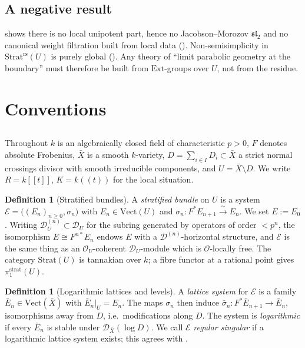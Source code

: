 \documentclass[11pt,reqno]{amsart}
\newcommand{\cO}{\mathcal{O}}
\newcommand{\cD}{\mathcal{D}}
\newcommand{\cE}{\mathcal{E}}
\newcommand{\Strat}{\mathrm{Strat}}
\newcommand{\rs}{\mathrm{rs}}
\newcommand{\strat}{\mathrm{strat}}
\newcommand{\Vect}{\mathrm{Vect}}
\newcommand{\Ext}{\mathrm{Ext}}
\newcommand{\isoto}{\xrightarrow{\ \sim\ }}
\theoremstyle{plain}
\theoremstyle{definition}
\newtheorem{definition}[theorem]{Definition}
\theoremstyle{remark}
\numberwithin{equation}{section}
\begin{document}
\subsection{A negative result}
 shows there is no local unipotent part, hence no
Jacobson--Morozov $\mathfrak{sl}_2$ and no canonical weight filtration
built from local data ().  Non-semisimplicity in
$\Strat^{\rs}(U)$ is purely global ().  Any theory of
``limit parabolic geometry at the boundary'' must therefore be built from
$\Ext$-groups over $U$, not from the residue.

\section{Conventions}\label{sec:conventions}

\subsection{}
Throughout $k$ is an algebraically closed field of characteristic $p>0$,
$F$ denotes absolute Frobenius, $\bar X$ is a smooth $k$-variety,
$D=\sum_{i\in I}D_i\subset\bar X$ a strict normal crossings divisor with
smooth irreducible components, and $U=\bar X\setminus D$.  We write
$R=k[[t]]$, $K=k((t))$ for the local situation.

\begin{definition}[Stratified bundles]
A \emph{stratified bundle} on $U$ is a system
$\cE=\bigl((E_n)_{n\ge0},\sigma_n\bigr)$ with $E_n\in\Vect(U)$ and
$\sigma_n\colon F^*E_{n+1}\isoto E_n$.  We set $E:=E_0$.  Writing
$\cD_U^{(n)}\subset\cD_U$ for the subring generated by operators of order
$<p^n$, the isomorphism $E\cong F^{n*}E_n$ endows $E$ with a
$\cD^{(n)}$-horizontal structure, and $\cE$ is the same thing as an
$\cO_U$-coherent $\cD_U$-module which is $\cO$-locally free.
The category $\Strat(U)$ is tannakian over $k$; a fibre functor at a
rational point gives $\pi_1^{\strat}(U)$.
\end{definition}

\begin{definition}[Logarithmic lattices and levels]\label{def:lattice}
A \emph{lattice system} for $\cE$ is a family $\bar E_n\in\Vect(\bar X)$
with $\bar E_n|_U=E_n$.  The maps $\sigma_n$ then induce
$\bar\sigma_n\colon F^*\bar E_{n+1}\to\bar E_n$, isomorphisms away from
$D$, i.e.\ modifications along $D$.  The system is \emph{logarithmic} if
every $\bar E_n$ is stable under $\cD_{\bar X}(\log D)$.
We call $\cE$ \emph{regular singular} if a logarithmic lattice system
exists; this agrees with \cite{Kindler}.
\end{definition}
\end{document}
